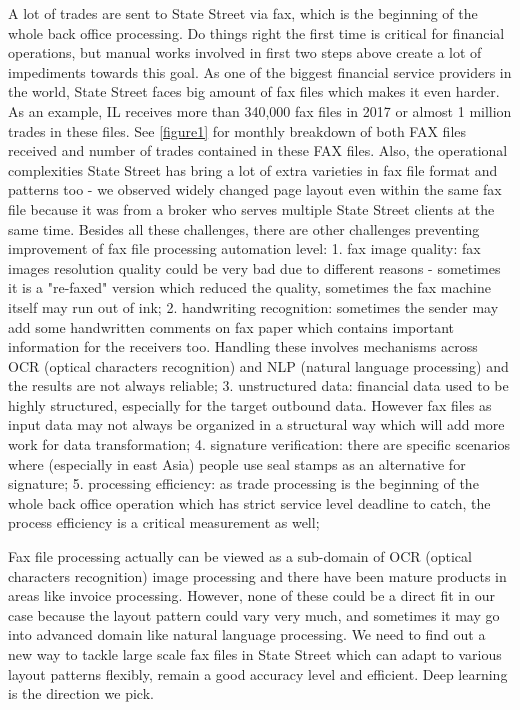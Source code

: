 \documentclass[sigconf]{acmart}
\begin{document}
A lot of trades are sent to State Street via fax, which is the beginning of the whole back office processing. Do things right the first time is critical for financial operations, but manual works involved in first two steps above create a lot of impediments towards this goal. As one of the biggest financial service providers in the world, State Street faces big amount of fax files which makes it even harder. As an example, IL receives more than 340,000 fax files in 2017 or almost 1 million trades in these files. See \ref{figure1} for monthly breakdown of both FAX files received and number of trades contained in these FAX files. Also, the operational complexities State Street has bring a lot of extra varieties in fax file format and patterns too - we observed widely changed page layout even within the same fax file because it was from a broker who serves multiple State Street clients at the same time. Besides all these challenges, there are other challenges preventing improvement of fax file processing automation level:
1. fax image quality: fax images resolution quality could be very bad due to different reasons - sometimes it is a "re-faxed" version which reduced the quality, sometimes the fax machine itself may run out of ink;
2. handwriting recognition: sometimes the sender may add some handwritten comments on fax paper which contains important information for the receivers too. Handling these involves mechanisms across OCR (optical characters recognition) and NLP (natural language processing) and the results are not always reliable;
3. unstructured data: financial data used to be highly structured, especially for the target outbound data. However fax files as input data may not always be organized in a structural way which will add more work for data transformation;
4. signature verification: there are specific scenarios where (especially in east Asia) people use seal stamps as an alternative for signature;
5. processing efficiency: as trade processing is the beginning of the whole back office operation which has strict service level deadline to catch, the process efficiency is a critical measurement as well;


Fax file processing actually can be viewed as a sub-domain of OCR (optical characters recognition) image processing and there have been mature products in areas like invoice processing. However, none of these could be a direct fit in our case because the layout pattern could vary very much, and sometimes it may go into advanced domain like natural language processing. We need to find out a new way to tackle large scale fax files in State Street which can adapt to various layout patterns flexibly, remain a good accuracy level and efficient. Deep learning is the direction we pick.
\end{document}
